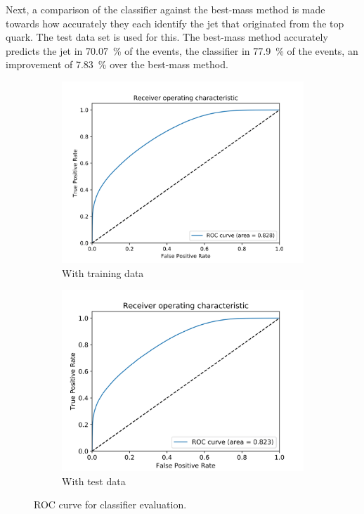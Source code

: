 Next, a comparison of the classifier against the best-mass method is made towards how accurately they each identify the jet that originated from the top quark. The test data set is used for this. The best-mass method accurately predicts the jet in \SI{70.07}{\%} of the events, the classifier in \SI{77.9}{\%} of the events, an improvement of \SI{7.83}{\%} over the best-mass method.

\begin{figure}[h]
    \centering
    \begin{subfigure}{0.5\textwidth}
        \centering
        \includegraphics[width=\textwidth]{assets/chap04/roc_train.png}
        \caption{With training data}
        \label{fig:ch_4_roc_train}
    \end{subfigure}%
    \begin{subfigure}{0.5\textwidth}
        \centering
        \includegraphics[width=\textwidth]{assets/chap04/roc_test.png}
        \caption{With test data}
        \label{fig:ch_4_roc_test}
    \end{subfigure}
    \caption{ROC curve for classifier evaluation.}
    \label{fig:ch_4_roc}
\end{figure}